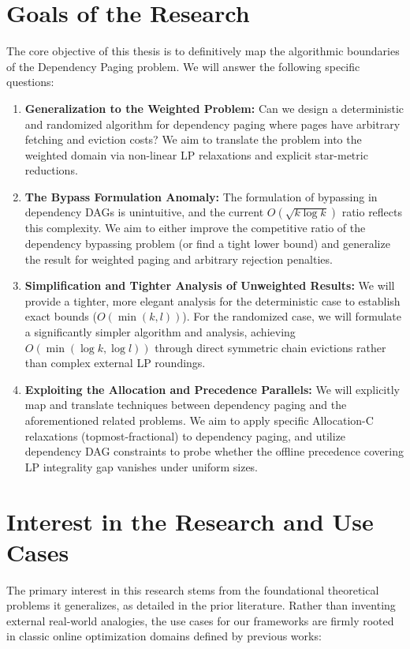 \documentclass[a4paper,11pt]{article}
\begin{document}
\section{Goals of the Research}
The core objective of this thesis is to definitively map the algorithmic boundaries of the Dependency Paging problem. We will answer the following specific questions:

\begin{enumerate}
    \item \textbf{Generalization to the Weighted Problem:} Can we design a deterministic and randomized algorithm for dependency paging where pages have arbitrary fetching and eviction costs? We aim to translate the problem into the weighted domain via non-linear LP relaxations and explicit star-metric reductions.
    \item \textbf{The Bypass Formulation Anomaly:} The formulation of bypassing in dependency DAGs is unintuitive, and the current $O(\sqrt{k \log k})$ ratio reflects this complexity. We aim to either improve the competitive ratio of the dependency bypassing problem (or find a tight lower bound) and generalize the result for weighted paging and arbitrary rejection penalties.
    \item \textbf{Simplification and Tighter Analysis of Unweighted Results:} We will provide a tighter, more elegant analysis for the deterministic case to establish exact bounds ($O(\min(k,l))$). For the randomized case, we will formulate a significantly simpler algorithm and analysis, achieving $O(\min(\log k, \log l))$ through direct symmetric chain evictions rather than complex external LP roundings.
    \item \textbf{Exploiting the Allocation and Precedence Parallels:} We will explicitly map and translate techniques between dependency paging and the aforementioned related problems. We aim to apply specific Allocation-C relaxations (topmost-fractional) to dependency paging, and utilize dependency DAG constraints to probe whether the offline precedence covering LP integrality gap \cite{kolliopoulos2023precedence} vanishes under uniform sizes.
\end{enumerate}

\section{Interest in the Research and Use Cases}
The primary interest in this research stems from the foundational theoretical problems it generalizes, as detailed in the prior literature. Rather than inventing external real-world analogies, the use cases for our frameworks are firmly rooted in classic online optimization domains defined by previous works:
\end{document}
